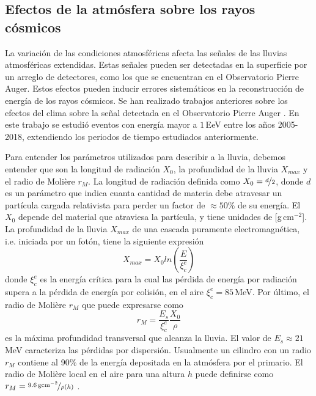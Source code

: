 \subsection{Efectos de la atmósfera sobre los rayos cósmicos}

La variación de las condiciones atmosféricas afecta las señales de las lluvias atmosféricas extendidas. Estas señales pueden ser detectadas en la superficie por un arreglo de detectores, como los que se encuentran en el Observatorio Pierre Auger. Estos efectos pueden inducir errores sistemáticos en la reconstrucción de energía de los rayos cósmicos. Se han realizado  trabajos anteriores sobre los efectos del clima sobre la señal detectada en el Observatorio Pierre Auger \cite{collaboration2009atmospheric} \cite{aab2017impact}. En este trabajo se estudió eventos con energía mayor a $1\,$EeV entre los años 2005-2018, extendiendo los periodos de tiempo estudiados anteriormente.

Para entender los parámetros utilizados para describir a la lluvia, debemos entender que son la longitud de radiación $X_0$, la profundidad de la lluvia $X_{max}$ y el radio de Molière $r_M$. La longitud de radiación definida como $X_0=\nicefrac{d}{2}$,  donde $d$ es un parámetro que indica cuanta cantidad de materia debe atravesar un partícula cargada relativista para perder un factor de $\approx 50\%$ de su  energía. El $X_0$ depende del material que atraviesa la partícula, y tiene unidades de [g\,cm$^{-2}$]. La profundidad de la lluvia $X_{max}$ de una cascada puramente electromagnética, i.e. iniciada por un fotón, tiene la siguiente expresión \cite{matthews2005heitler}
\begin{equation}
 	X_{max} = X_0{ln(\frac{E}{\xi^e_c})}
 \end{equation} 
donde  $\xi^e_c$ es la energía crítica para la cual las pérdida de energía por radiación supera a la pérdida de energía por colisión, en el aire $\xi^e_c=85\,$MeV. Por último, el radio de Molière $r_M$ que puede expresarse como 
\begin{equation}
	r_M= \frac{E_s}{\xi^e_c}\frac{X_0}{\rho}
\end{equation}
es la máxima profundidad transversal que alcanza la lluvia. El valor de $E_s\approx21\,$MeV caracteriza las pérdidas por dispersión. Usualmente un cilindro con un radio $r_M$ contiene al 90\% de la energía depositada en la atmósfera por el primario. El radio de Molière local en el aire para una altura $h$ puede definirse como $r_M = \nicefrac{9.6\,\text{gcm}^{-2}}{\rho(h)}$ \cite{gora2006universal}. 

